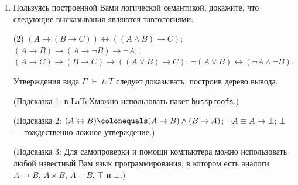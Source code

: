 \documentclass{article}
\DeclareMathOperator{\tstl}{\ \vdash\ }
\begin{document}
\begin{enumerate}
    \item Пользуясь построенной Вами логической семантикой, докажите, что следующие высказывания являются тавтологиями:
    \begin{tasks}(2)
        \task $(A\to(B\to C))\leftrightarrow((A\land B)\to C)$;
        \task $(A\to B)\to(A\to\neg B)\to\neg A$;
        \task $(A\to C)\to(B\to C)\to((A\lor B)\to C)$;
        \task $\neg(A\lor B)\leftrightarrow(\neg A\land\neg B)$.
    \end{tasks}
    Утверждения вида $\Gamma\tstl t:T$ следует доказывать, построив дерево вывода.

    (Подсказка 1: в \LaTeX\;можно использовать пакет \texttt{bussproofs}.)

    (Подсказка 2: $(A\leftrightarrow B)\colonequals(A\to B)\land(B\to A)$; $\neg A\equiv A\to\bot$; $\bot$ --- тождественно ложное утверждение.)

    (Подсказка 3: Для самопроверки и помощи компьютера можно использовать любой известный Вам язык программирования, в котором есть аналоги $A\to B$, $A\times B$, $A + B$, $\top$ и $\bot$.)


\end{enumerate}
\end{document}
